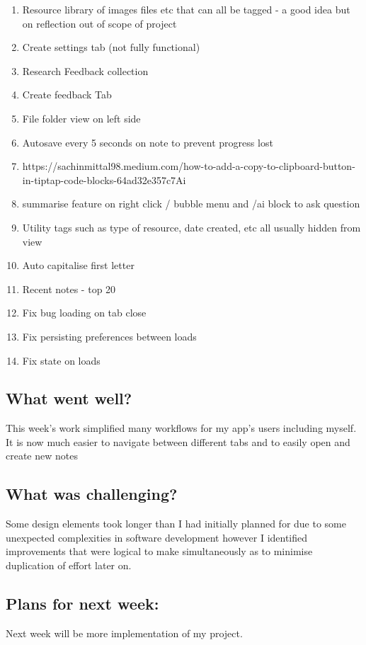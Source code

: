 \begin{enumerate}
    \item Resource library of images files etc that can all be tagged  - a good idea but on reflection out of scope of project
    \item Create settings tab  (not fully functional)
    \item Research Feedback collection 
    \item Create feedback Tab 
    \item File folder view on left side 
    \item Autosave every 5 seconds on note to prevent progress lost 
    \item https://sachinmittal98.medium.com/how-to-add-a-copy-to-clipboard-button-in-tiptap-code-blocks-64ad32e357c7Ai 
    \item summarise feature on right click / bubble menu and /ai block to ask question 
    \item Utility tags such as type of resource, date created,  etc all usually hidden from view 
    \item Auto capitalise first letter 
    \item Recent notes - top 20 
    \item Fix bug loading on tab close 
    \item Fix persisting preferences between loads 
    \item Fix state on loads 
\end{enumerate}

\subsection*{What went well?}
This week's work simplified many workflows for my app's users including myself. It is now much easier to navigate between different tabs and to easily open and create new notes

\subsection*{What was challenging?}
Some design elements took longer than I had initially planned for due to some unexpected complexities in software development however I identified improvements that were logical to make simultaneously as to minimise duplication of effort later on.


\subsection*{Plans for next week:}
Next week will be more implementation of my project.
